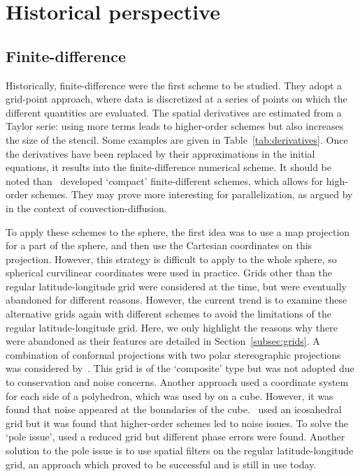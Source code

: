 \section{Historical perspective}
\label{sec:history}
\subsection{Finite-difference}
Historically, finite-difference were the first scheme to be studied. They
adopt a grid-point approach, where data is discretized at a series of points on which
the different quantities are evaluated. The spatial derivatives are estimated
from a Taylor serie: using more terms leads to higher-order schemes but also
increases the size of the \gls{stencil}. Some examples are given in
Table~\ref{tab:derivatives}. Once the derivatives have been replaced by their
approximations in the initial equations, it results into the finite-difference
numerical scheme. It should be noted than~\cite{Lele1992} developed `compact'
finite-different schemes, which allows for high-order schemes. They may prove
more interesting for parallelization, as argued by~\cite{Dixon2003} in the
context of convection-diffusion.

To apply these schemes to the sphere, the first idea was to use a map projection
for a part of the sphere, and then use the Cartesian coordinates on this
projection. However, this strategy is difficult to apply to the whole sphere, so
spherical curvilinear coordinates were used in practice. Grids other than the
regular latitude-longitude grid were considered at the time, but were eventually
abandoned for different reasons.  However, the current trend is to examine these
alternative grids again with different schemes to avoid the limitations of the
regular latitude-longitude grid.  Here, we only highlight the reasons why there
were abandoned as their features are detailed in Section~\ref{subsec:grids}. A
combination of conformal projections with two polar stereographic projections
was considered by~\cite{Phillips1957}. This grid is of the `composite' type but
was not adopted due to conservation and noise concerns. Another approach used a
coordinate system for each side of a polyhedron, which was used by
\cite{Sadourny1972} on a cube. However, it was found that noise appeared at the
boundaries of the cube.~\cite{Sadourny1968} used an icosahedral grid but it was
found that higher-order schemes led to noise issues. To solve the `pole issue',
\cite{Kurihara1965} used a reduced grid but different phase errors were found.
Another solution to the pole issue is to use spatial filters on the regular
latitude-longitude grid, an approach which proved to be successful and is still
in use today.

